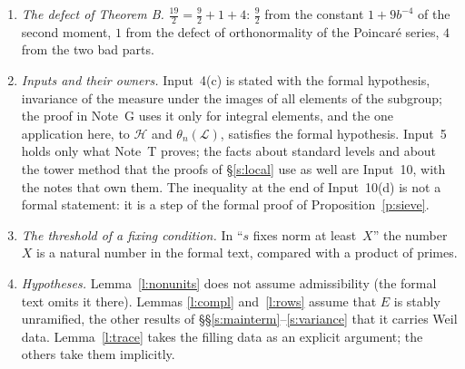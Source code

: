 \documentclass[11pt,a4paper]{article}
\newcommand{\Q}{\mathbb{Q}}
\newcommand{\m}[1]{\mbox{$#1$}}        %
\theoremstyle{plainx}
\theoremstyle{uprightx}
\newcommand{\cL}{\mathcal{L}}                       %
\newcommand{\mH}[1]{\theta_{n}(#1)}                 %
\newcommand{\hdens}[4]{\mathsf{h}_{#2}(#1;#3,#4)}   %
\begin{document}
\begin{enumerate}[leftmargin=1.6em,itemsep=3pt]
dossier. (a)~In Lemma~\ref{l:oneprime}: $6k\le9(k-10^{10}n^4)$ and $k-10^{10}n^4+1<2\varrho+k+1$. (b)~In the
proof of Theorem~C the matrix of the frame vectors has $l$ columns, for an order \m{l\le\varrho+1}, the bound
needed is $q_0^{2l+2\varrho+k+1}\le b^{12k}$, which follows from $44\varrho+33\le k$, and each order
contributes at most \m{3b^{-10}} of the total; the dossier's steps 13 to~15 of this proof state other exponents
(\m{l+1} columns, a bound \m{1/b^{10}} for the second term, and an inequality with \m{6k}), which the formal
text does not need. (c)~In Proposition~\ref{p:siegel} the ideal zeta function is taken at \m{3\varrho+5}, with
the conditions $[E:\Q]\le2^{2\varrho}$ and $6\varrho+12\le k$; the dossier's steps 1.25.3 and~1.25.4 name
\m{\varrho+1} and $2(\varrho+2)\le k$. (d)~In the proof of Theorem~D the factors
$(1+b^{-4})^3+b^{-12}\le(1-b^{-4})(1+9b^{-4})$ and the final factor \m{\le1+b^{-4}} were recomputed, and so was
the identity $\rho_t(p)\hdens{\cL}{\varrho}{\omega_p}{1}=r\sqrt G$ of Step~4, which the formal text verifies by
expanding both sides; the computation is in the proof.
\item \emph{The defect of Theorem B.} \m{\tfrac{19}2=\tfrac92+1+4}: \m{\tfrac92} from the constant
\m{1+9b^{-4}} of the second moment, $1$ from the defect of orthonormality of the Poincaré series, $4$ from the
two bad parts.
\item \emph{Inputs and their owners.} Input~4(c) is stated with the formal hypothesis, invariance of the measure
under the images of all elements of the subgroup; the proof in Note~G uses it only for integral elements, and
the one application here, to \m{\mathcal H} and \m{\mH{\cL}}, satisfies the formal hypothesis. Input~5 holds only
what Note~T proves; the facts about standard levels and about the tower method that the proofs of
§\ref{s:local} use as well are Input~10, with the notes that own them. The inequality at the end of Input~10(d)
is not a formal statement: it is a step of the formal proof of Proposition~\ref{p:sieve}.
\item \emph{The threshold of a fixing condition.} In ``$s$ fixes norm at least~$X$'' the number $X$ is a
natural number in the formal text, compared with a product of primes.
\item \emph{Hypotheses.} Lemma~\ref{l:nonunits} does not assume admissibility (the formal text omits it
there). Lemmas \ref{l:compl} and~\ref{l:rows} assume that $E$ is stably unramified, the other results of
§§\ref{s:mainterm}--\ref{s:variance} that it carries Weil data. Lemma~\ref{l:trace} takes the filling data as an
explicit argument; the others take them implicitly.
\end{enumerate}
\end{document}
